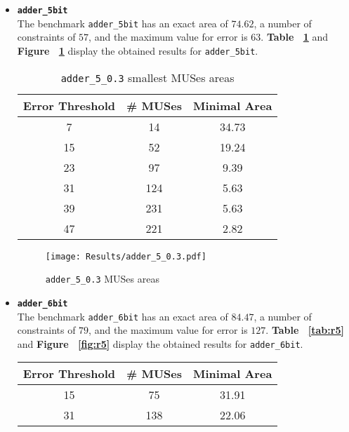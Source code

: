 \documentclass[]{usiinfbachelorproject}
\begin{document}
\begin{itemize}
\begin{figure}[H]
        \end{figure}
    \item \texttt{\textbf{adder\_5bit}}\\
        The benchmark \texttt{adder\_5bit} has an exact area of $74.62$, a number of constraints of $57$, and the maximum value for error is $63$. \textbf{Table ~\ref{tab:r4}} and \textbf{Figure ~\ref{fig:r4}} display the obtained results for \texttt{adder\_5bit}.
        \begin{table}[H]
            \centering
            \begin{tabular}{c|c|c}
                \textbf{Error Threshold} & \textbf{\# MUSes} & \textbf{Minimal Area} \\ \hline
                7 & 14 & 34.73 \\
                \hline
                15 & 52 & 19.24 \\
                \hline
                23 & 97 & 9.39 \\
                \hline
                31 & 124 & 5.63 \\
                \hline
                39 & 231 & 5.63 \\
                \hline
                47 & 221 & 2.82    
            \end{tabular}
            \caption{\texttt{adder\_5\_0.3} smallest MUSes areas}
            \label{tab:r4}
        \end{table}
        \begin{figure}[H]
            \centering
            \texttt{[image: Results/adder\_5\_0.3.pdf]}
            \caption{\texttt{adder\_5\_0.3} MUSes areas}
            \label{fig:r4}
        \end{figure}
    \item \texttt{\textbf{adder\_6bit}}\\
        The benchmark \texttt{adder\_6bit} has an exact area of $84.47$, a number of constraints of $79$, and the maximum value for error is $127$. \textbf{Table ~\ref{tab:r5}} and \textbf{Figure ~\ref{fig:r5}} display the obtained results for \texttt{adder\_6bit}.
        \begin{table}[H]
            \centering
            \begin{tabular}{c|c|c}
                \textbf{Error Threshold} & \textbf{\# MUSes} & \textbf{Minimal Area} \\ \hline
                15 & 75 & 31.91 \\
                \hline
                31 & 138 & 22.06 \\

\end{tabular}
\end{table}
\end{itemize}
\end{document}
